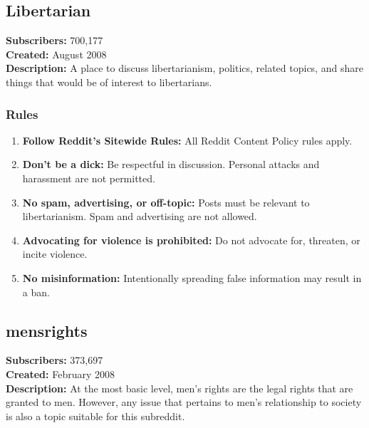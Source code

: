 \subsection{Libertarian}
\textbf{Subscribers:} 700,177 \\
\textbf{Created:} August 2008 \\
\textbf{Description:} A place to discuss libertarianism, politics, related topics, and share things that would be of interest to libertarians.

\subsubsection{Rules}
\begin{enumerate}
    \item \textbf{Follow Reddit's Sitewide Rules:} All Reddit Content Policy rules apply.
    
    \item \textbf{Don't be a dick:} Be respectful in discussion. Personal attacks and harassment are not permitted.
    
    \item \textbf{No spam, advertising, or off-topic:} Posts must be relevant to libertarianism. Spam and advertising are not allowed.
    
    \item \textbf{Advocating for violence is prohibited:} Do not advocate for, threaten, or incite violence.
    
    \item \textbf{No misinformation:} Intentionally spreading false information may result in a ban.
\end{enumerate}

\subsection{mensrights}
\textbf{Subscribers:} 373,697 \\
\textbf{Created:} February 2008 \\
\textbf{Description:} At the most basic level, men's rights are the legal rights that are granted to men. However, any issue that pertains to men's relationship to society is also a topic suitable for this subreddit.

